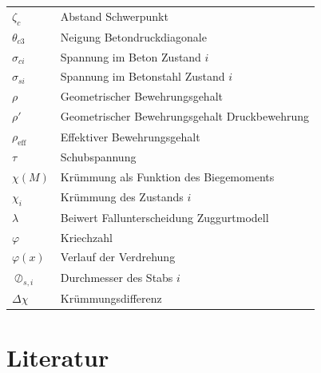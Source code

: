 \documentclass[
  12pt,
  letterpaper,
  egregdoesnotlikesansseriftitles]{scrreprt}
\begin{document}
\begin{longtable}[]{@{}
  >{\raggedright\arraybackslash}p{}
  >{\raggedright\arraybackslash}p{}@{}}
\(\zeta_c\) & Abstand Schwerpunkt \\
\(\theta_{c3}\) & Neigung Betondruckdiagonale \\
\(\sigma_{ci}\) & Spannung im Beton Zustand \(i\) \\
\(\sigma_{si}\) & Spannung im Betonstahl Zustand \(i\) \\
\(\rho\) & Geometrischer Bewehrungsgehalt \\
\(\rho'\) & Geometrischer Bewehrungsgehalt Druckbewehrung \\
\(\rho_{\text{eff}}\) & Effektiver Bewehrungsgehalt \\
\(\tau\) & Schubspannung \\
\(\chi(M)\) & Krümmung als Funktion des Biegemoments \\
\(\chi_i\) & Krümmung des Zustands \(i\) \\
\(\lambda\) & Beiwert Fallunterscheidung Zuggurtmodell \\
\(\varphi\) & Kriechzahl \\
\(\varphi(x)\) & Verlauf der Verdrehung \\
\(\oslash_{s,i}\) & Durchmesser des Stabs \(i\) \\
\(\Delta\chi\) & Krümmungsdifferenz \\
\end{longtable}


\hypertarget{literatur}{%
\chapter*{Literatur}\label{literatur}}

\end{document}
